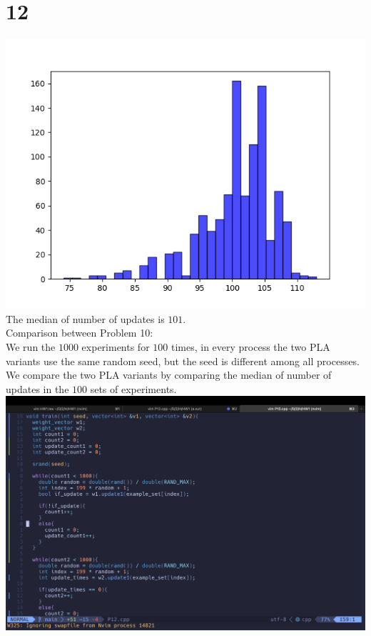 \documentclass[11pt]{article}
\theoremstyle{definition}
\begin{document}
\section*{12}
\includegraphics{P12_figure.png} \\
The median of number of updates is $101$. \\ 
Comparison between Problem 10: \\ 
We run the $1000$ experiments for $100$ times, in every process the two PLA variants use the same random seed, but the seed is different among all processes. We compare the two PLA variants by comparing the median of number of updates in the $100$ sets of experiments. \\
\newline
\includegraphics[width = \textwidth]{P12_code.png}\\
\end{document}

